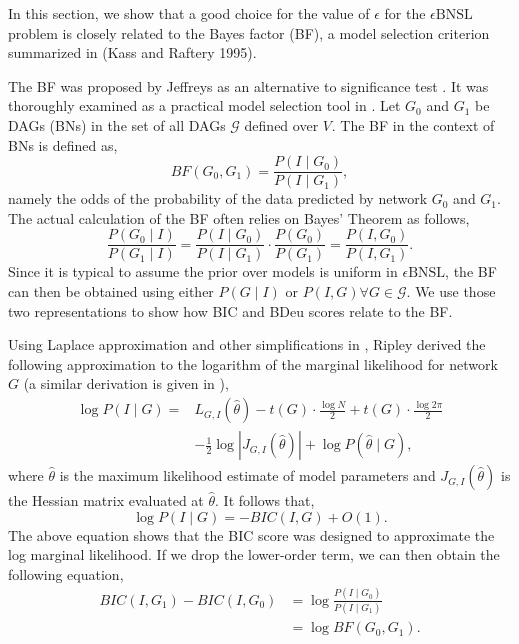 \documentclass[letterpaper]{article}
\newcommand{\graph}{\mathit{G}}
\newcommand{\graphset}{\mathcal{G}}
\newcommand{\vertex}[1]{V_{#1}}
\newcommand{\problem}{\mathit{\epsilon}\text{BNSL}}
\newcommand{\varI}{I}
\begin{document}
In this section, we show that a good choice for the value of $\epsilon$ for the
$\problem$ problem is closely related to the
Bayes factor (BF), a model selection criterion summarized in (Kass and Raftery 1995).

The BF was proposed by Jeffreys as an alternative to significance test \cite{jeffreys1967theory}. It was thoroughly examined as a practical model selection tool in \cite{kass1995bayes}. Let $\graph_0$ and $\graph_1$ be DAGs (BNs) in the set of all DAGs $\graphset$ defined over $\vertex{}$. The BF in the context of BNs is defined as,
$$
BF(\graph_0,\graph_1)=\frac{P(\varI \mid \graph_0)}{P(\varI \mid \graph_1)},
$$
namely the odds of the probability of the data predicted by network $\graph_0$ and $\graph_1$. The actual calculation of the BF often relies on  Bayes' Theorem as follows,
$$
\frac{P(\graph_0 \mid \varI)}{P(\graph_1 \mid \varI)}=\frac{P(\varI \mid \graph_0)}{P(\varI \mid \graph_1)}\cdot\frac{P(\graph_0)}{P(\graph_1)}=\frac{P(\varI,\graph_0)}{P(\varI,\graph_1)}.
$$
Since it is typical to assume the prior over models is uniform in $\problem$, the BF can then be obtained using either $P(\graph \mid \varI)$ or $P(\varI,\graph)\forall\graph\in\graphset$. We use those two representations to show how BIC and BDeu scores relate to the BF.

Using Laplace approximation and other simplifications in \cite{ripley1996pattern}, Ripley derived the following approximation to the logarithm of the marginal likelihood for network $\graph$ (a similar derivation is given in \cite{Claeskens2008}),
\begin{align*}
\log{P(\varI \mid \graph)} =& L_{G,I} (\hat{\theta}) - t({G})\cdot \frac{\log N}{2}+t({G}) \cdot \frac{\log{2\pi}}{2}\\
&-\frac{1}{2}\log{|J_{G,I} (\hat{\theta})|} + \log{P(\hat{\theta} \mid \graph)},
\end{align*}
where $\hat{\theta}$ is the maximum likelihood estimate of model parameters and $J_{G,I} (\hat{\theta})$ is the Hessian matrix evaluated at $\hat{\theta}$. It follows that,
$$
\log{P(\varI \mid \graph)}=-BIC(\varI,\graph)+O(1).
$$
The above equation shows that the BIC score was designed to approximate the log marginal likelihood.
If we drop the lower-order term, we can then obtain the following equation,
\begin{align*}
    BIC(\varI,\graph_1)-BIC(\varI,\graph_0)&=\log{\frac{P(\varI \mid \graph_0)}{P(\varI \mid \graph_1)}}\\
    &=\log{BF(\graph_0,\graph_1)}.
\end{align*}
\end{document}
